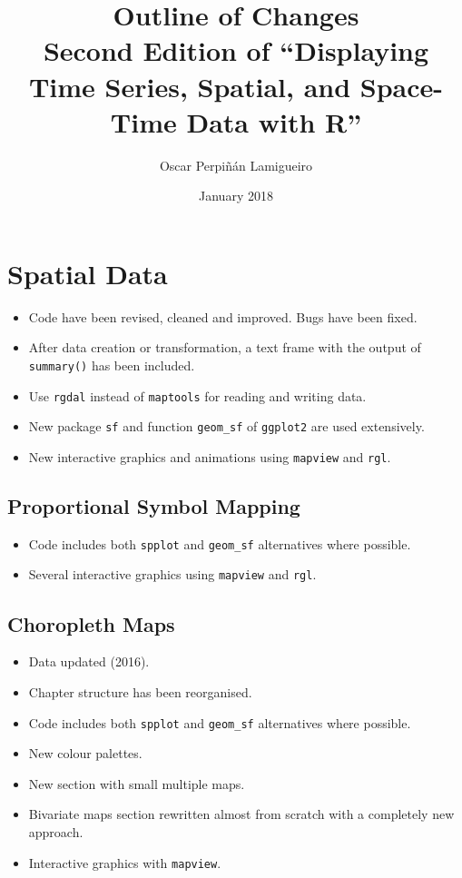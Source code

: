 \documentclass[11pt]{article}
\author{Oscar Perpiñán Lamigueiro}
\date{January 2018}
\title{Outline of Changes\\\medskip
\large Second Edition of ``Displaying Time Series, Spatial, and Space-Time Data with R''}
\begin{document}
\maketitle


\section*{Spatial Data}
\label{sec:orga00c22c}

\begin{itemize}
\item Code have been revised, cleaned and improved. Bugs have been fixed.

\item After data creation or transformation, a text frame with the output of \texttt{summary()} has been included.

\item Use \texttt{rgdal} instead of \texttt{maptools} for reading and writing data.

\item New package \texttt{sf} and function \texttt{geom\_sf} of \texttt{ggplot2} are used extensively.

\item New interactive graphics and animations using \texttt{mapview} and \texttt{rgl}.
\end{itemize}

\subsection*{Proportional Symbol Mapping}
\label{sec:orgae7439a}
\begin{itemize}
\item Code includes both \texttt{spplot} and \texttt{geom\_sf} alternatives where possible.
\item Several interactive graphics using \texttt{mapview} and \texttt{rgl}.
\end{itemize}

\subsection*{Choropleth Maps}
\label{sec:org0fdee4e}
\begin{itemize}
\item Data updated (2016).
\item Chapter structure has been reorganised.
\item Code includes both \texttt{spplot} and \texttt{geom\_sf} alternatives where possible.
\item New colour palettes.
\item New section with small multiple maps.
\item Bivariate maps section rewritten almost from scratch with a completely new approach.
\item Interactive graphics with \texttt{mapview}.
\end{itemize}
\end{document}
